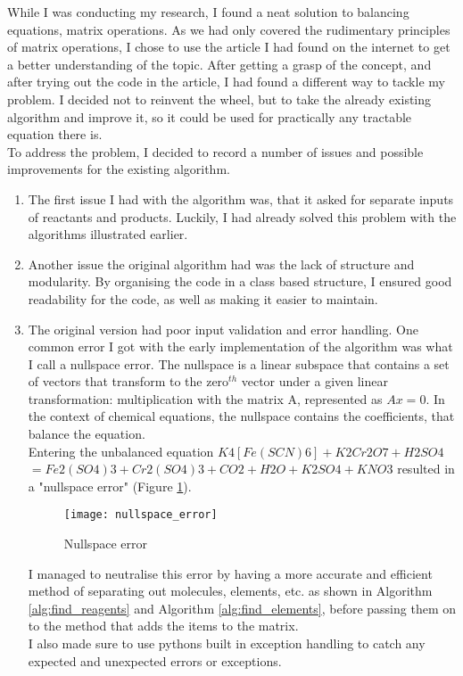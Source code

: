 \documentclass[a4paper,12pt]{article}
\begin{document}
While I was conducting my research, I found a neat solution to balancing equations, matrix operations. As we had only covered the rudimentary principles of matrix operations, I chose to use the article \cite{balancing-algorithm} I had found on the internet to get a better understanding of the topic. After getting a grasp of the concept, and after trying out the code in the article, I had found a different way to tackle my problem. I decided not to reinvent the wheel, but to take the already existing algorithm and improve it, so it could be used for practically any tractable equation there is.\\
To address the problem, I decided to record a number of issues and possible improvements for the existing algorithm.

\begin{enumerate}
\item The first issue I had with the algorithm was, that it asked for separate inputs of reactants and products. Luckily, I had already solved this problem with the algorithms illustrated earlier.
\item Another issue the original algorithm had was the lack of structure and modularity. By organising the code in a class based structure, I ensured good readability for the code, as well as making it easier to maintain.
\item The original version had poor input validation and error handling. One common error I got with the early implementation of the algorithm was what I call a nullspace error. The nullspace is a linear subspace that contains a set of vectors that transform to the zero$^{th}$ vector under a given linear transformation: multiplication with the matrix A, represented as $ Ax = 0$.\cite{nullspace} In the context of chemical equations, the nullspace contains the coefficients, that balance the equation.\\
Entering the unbalanced equation $ K4[Fe(SCN)6] + K2Cr2O7 + H2SO4$\\ $ = Fe2(SO4)3 + Cr2(SO4)3 + CO2 + H2O + K2SO4 + KNO3$ resulted in a "nullspace error" (Figure \ref{fig:nullspace_error}). 

\newpage

\begin{figure} [h]
	\centering
	\texttt{[image: nullspace\_error]}
	\caption{Nullspace error}
	\label{fig:nullspace_error}
\end{figure}

I managed to neutralise this error by having a more accurate and efficient method of separating out molecules, elements, etc. as shown in Algorithm \ref{alg:find_reagents} and Algorithm \ref{alg:find_elements}, before passing them on to the method that adds the items to the matrix.\\
I also made sure to use pythons built in exception handling to catch any expected and unexpected errors or exceptions.
\end{enumerate}
\end{document}
